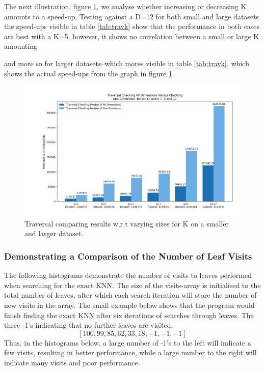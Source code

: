 
The next illustration, figure \ref{fig:trav2}, we analyse whether increasing or decreasing K amounts to a speed-up. Testing against a D=12 for both small and large datasets the speed-ups visible in table \ref{tab:travk} show that the performance in both cases are best with a K=5, however, it shows no correlation between a small or large K amounting 

and more so for larger datasets--which mores visible in table \ref{tab:travk}, which shows the actual speed-ups from the graph in figure \ref{fig:trav2}.




\begin{figure}[H]
\centering
\includegraphics[width=1\textwidth]{pics/plot-figs/new-trav-d12-k1k5k17.png}
\caption{Traversal comparing results w.r.t varying sizes for K on a smaller and larger dataset.}
\label{fig:trav2}
\end{figure}


\subsubsection{Demonstrating a Comparison of the Number of Leaf Visits}

The following histograms demonstrate the number of visits to leaves performed when searching for the exact KNN. The size of the visits-array is initialised to the total number of leaves,  after which each search iteration will store the number of new visits in the array. The small example below shows that the program would finish finding the exact KNN after six iterations of searches through leaves. The three -1’s indicating that no further leaves are visited. 
$$[100, 99, 85, 62, 33, 18, -1, -1, -1]$$
Thus, in the histograms below, a large number of -1's to the left will indicate a few visits, resulting in better performance, while a large number to the right will indicate many visits and poor performance.  

